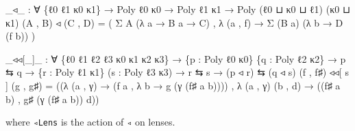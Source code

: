 \documentclass[
  11pt,
  oneside,
  article]{memoir}
\newenvironment{Shaded}{}{}
\newcommand{\NormalTok}[1]{#1}
\newcommand{\OtherTok}[1]{\textcolor[rgb]{0.00,0.44,0.13}{#1}}
\theoremstyle{definition}
\theoremstyle{plain}
\newcommand{\0}{\textsf{0}}
\newcommand{\1}{\tn{\textsf{1}}}
\begin{document}
\begin{Shaded}
\begin{Highlighting}[]
\OtherTok{\_}\NormalTok{◃}\OtherTok{\_} \OtherTok{:} \OtherTok{∀} \OtherTok{\{}\NormalTok{ℓ0 ℓ1 κ0 κ1}\OtherTok{\}} \OtherTok{→}\NormalTok{ Poly ℓ0 κ0 }\OtherTok{→}\NormalTok{ Poly ℓ1 κ1 }
      \OtherTok{→}\NormalTok{ Poly }\OtherTok{(}\NormalTok{ℓ0 ⊔ κ0 ⊔ ℓ1}\OtherTok{)} \OtherTok{(}\NormalTok{κ0 ⊔ κ1}\OtherTok{)}
\OtherTok{(}\NormalTok{A , B}\OtherTok{)}\NormalTok{ ◃ }\OtherTok{(}\NormalTok{C , D}\OtherTok{)} \OtherTok{=} 
    \OtherTok{(}\NormalTok{ Σ A }\OtherTok{(λ}\NormalTok{ a }\OtherTok{→}\NormalTok{ B a }\OtherTok{→}\NormalTok{ C}\OtherTok{)} 
\NormalTok{    , }\OtherTok{λ} \OtherTok{(}\NormalTok{a , f}\OtherTok{)} \OtherTok{→}\NormalTok{ Σ }\OtherTok{(}\NormalTok{B a}\OtherTok{)} \OtherTok{(λ}\NormalTok{ b }\OtherTok{→}\NormalTok{ D }\OtherTok{(}\NormalTok{f b}\OtherTok{))} \OtherTok{)}

\OtherTok{\_}\NormalTok{◃◃[}\OtherTok{\_}\NormalTok{]}\OtherTok{\_} \OtherTok{:} \OtherTok{∀} \OtherTok{\{}\NormalTok{ℓ0 ℓ1 ℓ2 ℓ3 κ0 κ1 κ2 κ3}\OtherTok{\}}
        \OtherTok{→} \OtherTok{\{}\NormalTok{p }\OtherTok{:}\NormalTok{ Poly ℓ0 κ0}\OtherTok{\}} \OtherTok{\{}\NormalTok{q }\OtherTok{:}\NormalTok{ Poly ℓ2 κ2}\OtherTok{\}} \OtherTok{→}\NormalTok{ p ⇆ q}
        \OtherTok{→} \OtherTok{\{}\NormalTok{r }\OtherTok{:}\NormalTok{ Poly ℓ1 κ1}\OtherTok{\}} \OtherTok{(}\NormalTok{s }\OtherTok{:}\NormalTok{ Poly ℓ3 κ3}\OtherTok{)} \OtherTok{→}\NormalTok{ r ⇆ s }
        \OtherTok{→} \OtherTok{(}\NormalTok{p ◃ r}\OtherTok{)}\NormalTok{ ⇆ }\OtherTok{(}\NormalTok{q ◃ s}\OtherTok{)}
\OtherTok{(}\NormalTok{f , f♯}\OtherTok{)}\NormalTok{ ◃◃[ s ] }\OtherTok{(}\NormalTok{g , g♯}\OtherTok{)} \OtherTok{=}
    \OtherTok{((λ} \OtherTok{(}\NormalTok{a , γ}\OtherTok{)} \OtherTok{→} \OtherTok{(}\NormalTok{f a , }\OtherTok{λ}\NormalTok{ b\textquotesingle{} }\OtherTok{→}\NormalTok{ g }\OtherTok{(}\NormalTok{γ }\OtherTok{(}\NormalTok{f♯ a b\textquotesingle{}}\OtherTok{))))}
\NormalTok{    , }\OtherTok{λ} \OtherTok{(}\NormalTok{a , γ}\OtherTok{)} \OtherTok{(}\NormalTok{b\textquotesingle{} , d\textquotesingle{}}\OtherTok{)} \OtherTok{→} \OtherTok{((}\NormalTok{f♯ a b\textquotesingle{}}\OtherTok{)}\NormalTok{ , g♯ }\OtherTok{(}\NormalTok{γ }\OtherTok{(}\NormalTok{f♯ a b\textquotesingle{}}\OtherTok{))}\NormalTok{ d\textquotesingle{}}\OtherTok{))}
\end{Highlighting}
\end{Shaded}

where \texttt{◃Lens} is the action of \texttt{◃} on lenses.
\end{document}
